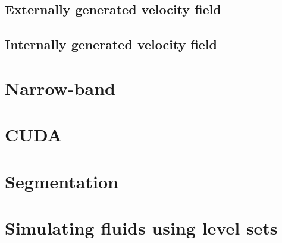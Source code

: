 \documentclass[a4paper, oneside]{memoir}
\begin{document}
\section{Externally generated velocity field}
%
\label{sec:extVel}

\section{Internally generated velocity field}\label{sec:intVel}


\chapter{Narrow-band}
\label{sec:narrowband}



\chapter{CUDA}
\label{sec:cuda}



\chapter{Segmentation}
\label{sec:segmentation}



\chapter{Simulating fluids using level sets}

\label{sec:fluid}


\appendix

\newpage




\end{document}

